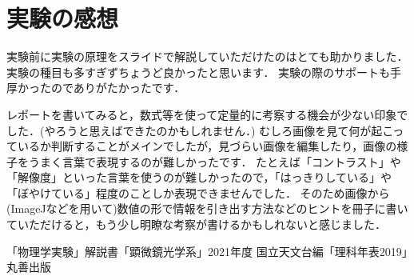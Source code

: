 \documentclass[titlepage]{jsarticle}
\begin{document}
\section{実験の感想}
実験前に実験の原理をスライドで解説していただけたのはとても助かりました．
実験の種目も多すぎずちょうど良かったと思います．
実験の際のサポートも手厚かったのでありがたかったです．

レポートを書いてみると，数式等を使って定量的に考察する機会が少ない印象でした．(やろうと思えばできたのかもしれません．)
むしろ画像を見て何が起こっているか判断することがメインでしたが，見づらい画像を編集したり，画像の様子をうまく言葉で表現するのが難しかったです．
たとえば「コントラスト」や「解像度」といった言葉を使うのが難しかったので，「はっきりしている」や「ぼやけている」程度のことしか表現できませんでした．
そのため画像から(ImageJなどを用いて)数値の形で情報を引き出す方法などのヒントを冊子に書いていただけると，もう少し明瞭な考察が書けるかもしれないと感じました．

\begin{thebibliography}{99}
   「物理学実験」解説書「顕微鏡光学系」2021年度
    国立天文台編「理科年表2019」丸善出版
\end{thebibliography}
\end{document}
